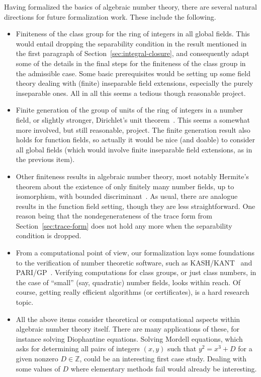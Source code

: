 \documentclass[a4paper,USenglish,cleveref, autoref, thm-restate]{lipics-v2021}
\newcommand{\C}{\mathbb{C}}
\newcommand{\Q}{\mathbb{Q}}
\newcommand{\Z}{\mathbb{Z}}
\begin{document}
Having formalized the basics of algebraic number theory, there are several natural directions for future formalization work. These include the following.
\begin{itemize}
\item Finiteness of the class group for the ring of integers in all global fields. This would entail dropping the separability condition in the result mentioned in the first paragraph of Section~\ref{sec:integral-closure}, and consequently adapt some of the details in the final steps for the finiteness of the class group in the admissible case. Some basic prerequisites would be setting up some field theory dealing with (finite) inseparable field extensions, especially the purely inseparable ones. 
All in all this seems a tedious though reasonable project.
\item Finite generation of the group of units of the ring of integers in a number field, or slightly stronger, Dirichlet's unit theorem~\cite[Theorem 7.4]{Neukirch}. This seems a somewhat more involved, but still reasonable, project. The finite generation result also holds for function fields, so actually it would be nice (and doable) to consider all global fields (which would  involve finite inseparable field extensions, as in the previous item).
\item Other finiteness results in algebraic number theory, most notably Hermite's theorem about the existence of only finitely many number fields, up to isomorphism,%
with bounded discriminant~\cite[Theorem 2.16]{Neukirch}. 
As usual, there are analogue results in the function field setting, though they are less straightforward. One reason being that the nondegenerateness of the trace form from Section~\ref{sec:trace-form} does not hold any more when the separability condition is dropped.
\item From a computational point of view, our formalization lays some foundations to the verification of number theoretic software, such as KASH/KANT~\cite{kash} and PARI/GP~\cite{PARI2}. Verifying computations for class groups, or just class numbers, in the case of ``small'' (say, quadratic) number fields, looks within reach. Of course, getting really efficient algorithms (or certificates), is a hard research topic. 
\item %
 All the above items consider theoretical or computational aspects within algebraic number theory itself. There are many applications of these, for instance solving Diophantine equations. Solving Mordell equations, which asks for determining all pairs of integers $(x,y)$ such that $y^2=x^3+D$ for a given nonzero $D\in\Z$, could be an interesting first case study. Dealing with some values of $D$ where elementary methods fail would already be interesting.
\end{itemize}
\end{document}
